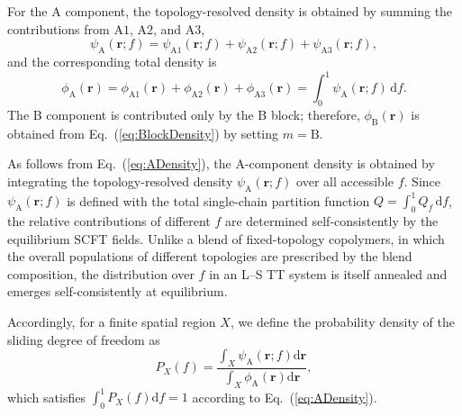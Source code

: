     For the A component, the topology-resolved density is obtained by summing the contributions from $\mathrm{A1}$, $\mathrm{A2}$, and $\mathrm{A3}$,
    \begin{equation}
        \psi_{\mathrm A}(\bm r;f)
        =
        \psi_{\mathrm{A1}}(\bm r;f)
        +
        \psi_{\mathrm{A2}}(\bm r;f)
        +
        \psi_{\mathrm{A3}}(\bm r;f),
        \label{eq:ATopologyDensity}
    \end{equation}
    and the corresponding total density is
    \begin{equation}
        \phi_{\mathrm A}(\bm r)
        =
        \phi_{\mathrm{A1}}(\bm r)
        +
        \phi_{\mathrm{A2}}(\bm r)
        +
        \phi_{\mathrm{A3}}(\bm r)
        =
        \int_0^1
        \psi_{\mathrm A}(\bm r;f)\,\mathrm df.
        \label{eq:ADensity}
    \end{equation}
    The B component is contributed only by the B block; therefore, $\phi_{\mathrm B}(\bm r)$ is obtained from Eq.~(\ref{eq:BlockDensity}) by setting $m=\mathrm B$. 


\label{sec:ProbabilityDensity}

    As follows from Eq.~(\ref{eq:ADensity}), the A-component density is obtained by integrating the topology-resolved density $\psi_{\mathrm A}(\bm r;f)$ over all accessible $f$.
    Since $\psi_{\mathrm A}(\bm r;f)$ is defined with the total single-chain partition function $Q=\int_0^1 Q_f\,\mathrm df$, the relative contributions of different $f$ are determined self-consistently by the equilibrium SCFT fields.
    Unlike a blend of fixed-topology copolymers, in which the overall populations of different topologies are prescribed by the blend composition, the distribution over $f$ in an L--S TT system is itself annealed and emerges self-consistently at equilibrium.


    
    Accordingly, for a finite spatial region $X$, we define the probability density of the sliding degree of freedom as
    \begin{equation}
        P_X(f)
        =
        \frac{
            \displaystyle
            \int_X
            \psi_{\mathrm A}(\bm r;f) \mathrm d\bm r
        }{
            \displaystyle
            \int_X
            \phi_{\mathrm A}(\bm r) \mathrm d\bm r
        },
        \label{eq:Probability}
    \end{equation}
    which satisfies $\int_0^1 P_X(f) \mathrm df=1$ according to Eq.~(\ref{eq:ADensity}).
    
